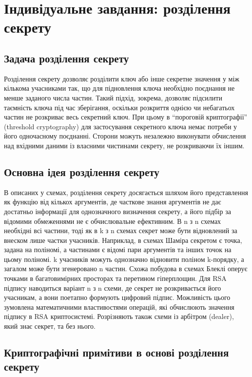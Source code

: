 \documentclass{kpi-lab}
\begin{document}
\chapter{Індивідуальне завдання: розділення секрету}

\section{Задача розділення секрету}

Розділення секрету дозволяє розділити ключ або інше
секретне значення у між кількома учасниками так,
що для підновлення ключа необхідно поєднання не менше
заданого числа частин. Такий підхід, зокрема, дозволяє
підсилити  таємність ключа під час зберігання,
оскільки розкриття однією чи небагатьох частин не розкриває
весь секретний ключ.
При цьому в \enquote{пороговій криптографії} (threshold cryptography)
для застосування секретного ключа немає потреби у його
одночасному поєднанні.
Сторони можуть незалежно виконувати обчислення над вхідними даними із
власними чистинами секрету, не розкриваючи їх іншим.
\cite{nist-ir-8214}

\section{Основна ідея розділення секрету}

В описаних у \cite{nist-ir-8214} схемах, розділення секрету
досягається шляхом його представлення як функцію від
кількох аргументів,
де часткове знання аргументів не дає достатньо
інформації для однозначного визначення секрету, а його
підбір за відомими обмеженнями не є обчислювальне
ефективним. В n з n схемах
необхідні всі частини, тоді як в k з n схемах секрет може
бути відновлений за внеском лише частки учасників.
Наприклад, в схемах Шаміра секретом є точка,
задана на поліномі, а частинами є відомі пари аргументів та
інших точок на цьому поліномі. k учасників можуть
однозначно відновити поліном k-порядку, а загалом може бути
згенеровано n частин. Схожа побудова в схемах Блеклі оперує
точками в багатовимірних просторах та перетином гіперплощин.
Для RSA підпису наводиться варіант n з n схеми, де секрет
не розкривається його учасникам, а вони поетапно формують
цифровий підпис. Можливість цього зумовлена математичними
властивостями операцій, які обчислюють значення підпису в
RSA криптосистемі. Розрізняють також схеми із арбітром
(dealer), який знає секрет, та без нього.

\section{Криптографічні примітиви в основі розділення секрету}
\end{document}
